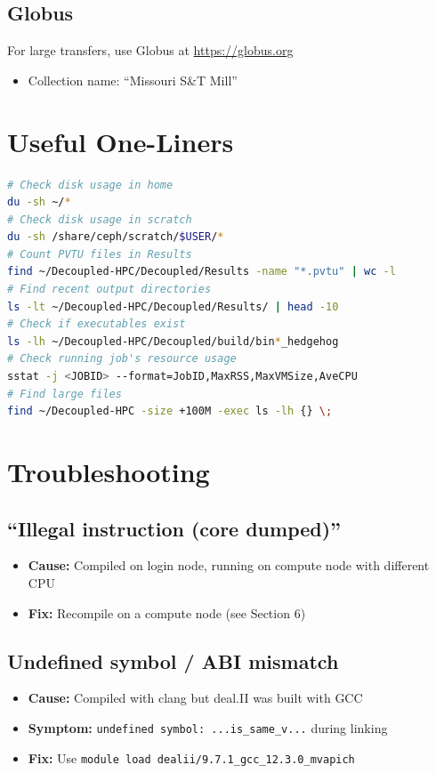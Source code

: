 \documentclass[11pt,a4paper]{article}
\begin{document}
\subsection{Globus}
For large transfers, use Globus at \url{https://globus.org}
\begin{itemize}
    \item Collection name: ``Missouri S\&T Mill''
\end{itemize}
\section{Useful One-Liners}
\begin{lstlisting}[language=bash]
# Check disk usage in home
du -sh ~/*
# Check disk usage in scratch
du -sh /share/ceph/scratch/$USER/*
# Count PVTU files in Results
find ~/Decoupled-HPC/Decoupled/Results -name "*.pvtu" | wc -l
# Find recent output directories
ls -lt ~/Decoupled-HPC/Decoupled/Results/ | head -10
# Check if executables exist
ls -lh ~/Decoupled-HPC/Decoupled/build/bin*_hedgehog
# Check running job's resource usage
sstat -j <JOBID> --format=JobID,MaxRSS,MaxVMSize,AveCPU
# Find large files
find ~/Decoupled-HPC -size +100M -exec ls -lh {} \;
\end{lstlisting}
\section{Troubleshooting}
\subsection{``Illegal instruction (core dumped)''}
\begin{itemize}
    \item \textbf{Cause:} Compiled on login node, running on compute node with different CPU
    \item \textbf{Fix:} Recompile on a compute node (see Section 6)
\end{itemize}
\subsection{Undefined symbol / ABI mismatch}
\begin{itemize}
    \item \textbf{Cause:} Compiled with clang but deal.II was built with GCC
    \item \textbf{Symptom:} \texttt{undefined symbol: ...is\_same\_v...} during linking
    \item \textbf{Fix:} Use \texttt{module load dealii/9.7.1\_gcc\_12.3.0\_mvapich}
\end{itemize}
\end{document}
